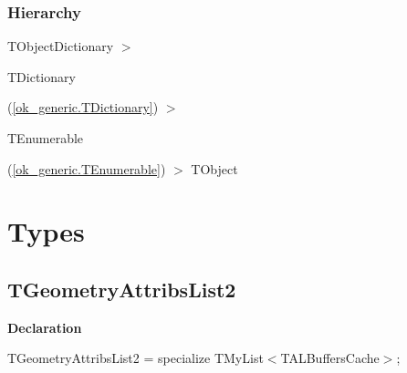 \documentclass{report}
\begin{document}
\subsubsection*{\large{\textbf{Hierarchy}}\normalsize\hspace{1ex}\hfill}
TObjectDictionary {$>$} \begin{ttfamily}TDictionary\end{ttfamily}(\ref{ok_generic.TDictionary}) {$>$} \begin{ttfamily}TEnumerable\end{ttfamily}(\ref{ok_generic.TEnumerable}) {$>$} 
TObject
\section{Types}
\subsection*{TGeometryAttribsList2}
\begin{list}{}{
\setlength{\itemindent}{0cm}
\setlength{\listparindent}{0cm}
\setlength{\leftmargin}{\evensidemargin}
\addtolength{\leftmargin}{\tmplength}
\settowidth{\labelsep}{X}
\addtolength{\leftmargin}{\labelsep}
\setlength{\labelwidth}{\tmplength}
}
\begin{flushleft}
\item[\textbf{Declaration}\hfill]
\begin{ttfamily}
TGeometryAttribsList2 = specialize TMyList{$<$}TALBuffersCache{$>$};\end{ttfamily}


\end{flushleft}
\end{list}
\end{document}
